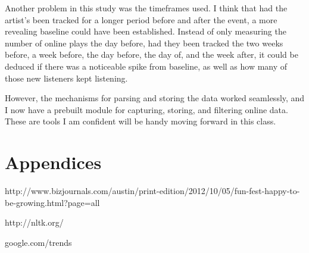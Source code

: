 \documentclass{article}
\begin{document}
Another problem in this study was the timeframes used. I think that had the artist's been tracked for a longer period before and after the event, a more revealing baseline could have been established. Instead of only measuring the number of online plays the day before, had they been tracked the two weeks before, a week before, the day before, the day of, and the week after, it could be deduced if there was a noticeable spike from baseline, as well as how many of those new listeners kept listening. \*

However, the mechanisms for parsing and storing the data worked seamlessly, and I now have a prebuilt module for capturing, storing, and filtering online data. These are tools I am confident will be handy moving forward in this class. 

\section{Appendices}

\* http://www.bizjournals.com/austin/print-edition/2012/10/05/fun-fest-happy-to-be-growing.html?page=all \*

http://nltk.org/ \*

google.com/trends
\end{document}
